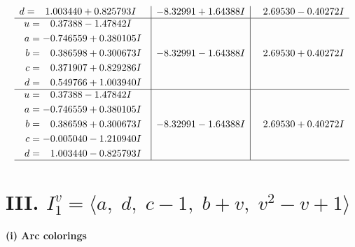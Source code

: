 \documentclass[1p]{elsarticle_modified}
\theoremstyle{definition}
\begin{document}
$$\begin{array}{c|c|c}
\begin{aligned}
d &= \phantom{-}1.003440 + 0.825793 I\end{aligned}
 & -8.32991 + 1.64388 I & \phantom{-}2.69530 - 0.40272 I \\ \hline\begin{aligned}
u &= \phantom{-}0.37388 - 1.47842 I \\
a &= -0.746559 + 0.380105 I \\
b &= \phantom{-}0.386598 + 0.300673 I \\
c &= \phantom{-}0.371907 + 0.829286 I \\
d &= \phantom{-}0.549766 + 1.003940 I\end{aligned}
 & -8.32991 - 1.64388 I & \phantom{-}2.69530 + 0.40272 I \\ \hline\begin{aligned}
u &= \phantom{-}0.37388 - 1.47842 I \\
a &= -0.746559 + 0.380105 I \\
b &= \phantom{-}0.386598 + 0.300673 I \\
c &= -0.005040 - 1.210940 I \\
d &= \phantom{-}1.003440 - 0.825793 I\end{aligned}
 & -8.32991 - 1.64388 I & \phantom{-}2.69530 + 0.40272 I\\
 \hline 
 \end{array}$$\newpage\newpage\renewcommand{\arraystretch}{1}
\centering \section*{III. $I^v_{1}= \langle a,\;d,\;c-1,\;b+v,\;v^2- v+1 \rangle$}
\flushleft \textbf{(i) Arc colorings}\\
\end{document}

